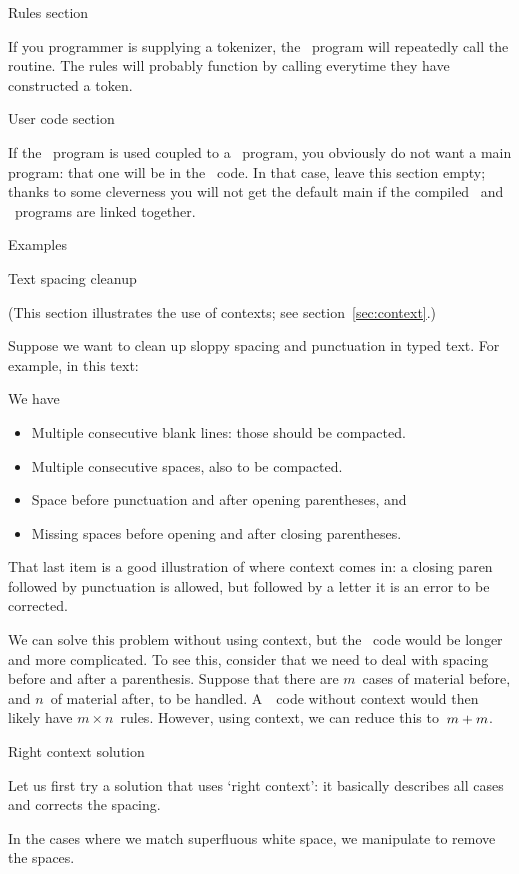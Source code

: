  {Rules section}

If you \lex programmer is supplying a tokenizer, the \yacc\ program
will repeatedly call the  routine. The rules will
probably function by calling  everytime they have
constructed a token.

 {User code section}

If the \lex\ program is used coupled to a \yacc\ program, you
obviously do not want a main program: that one will be in the
\yacc\ code. In that case, leave this section empty; thanks to some
cleverness you will not get the default main if the compiled \lex\ and
\yacc\ programs are linked together.

 {Examples}

 {Text spacing cleanup}
\label{sec:cleanup}

(This section illustrates the use of contexts; see section~\ref{sec:context}.)

Suppose we want to clean up sloppy spacing and punctuation in typed
text. For example, in this text:

We have
\begin{itemize}
\item Multiple consecutive blank lines: those should be compacted.
\item Multiple consecutive spaces, also to be compacted.
\item Space before punctuation and after opening parentheses, and
\item Missing spaces before opening and after closing parentheses.
\end{itemize}
That last item is a good illustration of where context comes in: a
closing paren followed by punctuation is allowed, but followed by a
letter it is an error to be corrected.

We can solve this problem without using context, but the \lex\ code
would be longer and more complicated. To see this, consider that we
need to deal with spacing before and after a parenthesis. Suppose that
there are $m$~cases of material before, and $n$~of material after, to
be handled. A~\lex\ code without context would then likely have
$m\times n$~rules. However, using context, we can reduce this
to~$m+\nobreak m$.

 {Right context solution}

Let us first try a solution that uses `right context': it basically
describes all cases and corrects the spacing.

%
In the cases where we match superfluous white space, we manipulate
 to remove the spaces.

